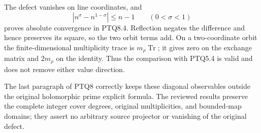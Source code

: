 The defect vanishes on line coordinates, and \[
|n^\sigma-n^{1-\sigma}|\le n-1
\qquad(0<\sigma<1)
\] proves absolute convergence in PTQ8.4. Reflection negates the
difference and hence preserves its square, so the two orbit terms add.
On a two-coordinate orbit the finite-dimensional multiplicity trace is
\(m_\rho\operatorname{Tr}\); it gives zero on the exchange matrix and
\(2m_\rho\) on the identity. Thus the comparison with PTQ5.4 is valid
and does not remove either value direction.

The last paragraph of PTQ8 correctly keeps these diagonal observables
outside the original holomorphic prime explicit formula. The reviewed
results preserve the complete integer cover degrees, original
multiplicities, and bounded-map domains; they assert no arbitrary source
projector or vanishing of the original defect.
